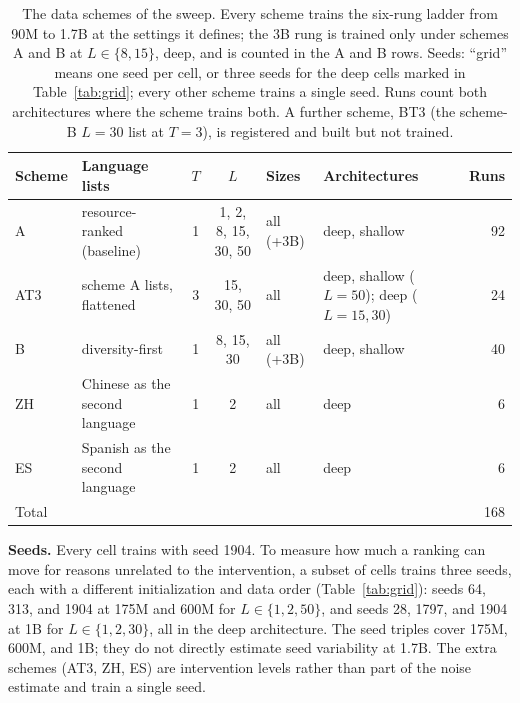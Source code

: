 \begin{table}[t]
\centering
\small
\setlength{\tabcolsep}{4pt}
\caption{The data schemes of the sweep. Every scheme trains the six-rung ladder from 90M to 1.7B at the settings it defines; the 3B rung is trained only under schemes A and B at $L \in \{8, 15\}$, deep, and is counted in the A and B rows. Seeds: ``grid'' means one seed per cell, or three seeds for the deep cells marked in Table~\ref{tab:grid}; every other scheme trains a single seed. Runs count both architectures where the scheme trains both. A further scheme, BT3 (the scheme-B $L=30$ list at $T=3$), is registered and built but not trained.}
\label{tab:schemes}
\begin{tabular}{llccllr}
\toprule
Scheme & Language lists & $T$ & $L$ & Sizes & Architectures & Runs \\
\midrule
A   & resource-ranked (baseline) & 1 & 1, 2, 8, 15, 30, 50 & all (+3B) & deep, shallow & 92 \\
AT3 & scheme A lists, flattened  & 3 & 15, 30, 50          & all & deep, shallow ($L=50$); deep ($L=15, 30$) & 24 \\
B   & diversity-first            & 1 & 8, 15, 30           & all (+3B) & deep, shallow & 40 \\
ZH  & Chinese as the second language & 1 & 2              & all & deep     & 6 \\
ES  & Spanish as the second language & 1 & 2              & all & deep     & 6 \\
\midrule
Total & & & & & & 168 \\
\bottomrule
\end{tabular}
\end{table}

\textbf{Seeds.} Every cell trains with seed 1904. To measure how much a ranking can move for reasons unrelated to the intervention, a subset of cells trains three seeds, each with a different initialization and data order (Table~\ref{tab:grid}): seeds 64, 313, and 1904 at 175M and 600M for $L \in \{1, 2, 50\}$, and seeds 28, 1797, and 1904 at 1B for $L \in \{1, 2, 30\}$, all in the deep architecture. The seed triples cover 175M, 600M, and 1B; they do not directly estimate seed variability at 1.7B. The extra schemes (AT3, ZH, ES) are intervention levels rather than part of the noise estimate and train a single seed.

